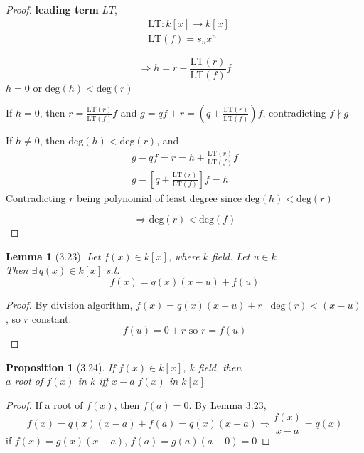 \documentclass[twoside,landscape]{amsart}
\theoremstyle{plain}
\newtheorem{lemma}{Lemma}
\newtheorem{proposition}{Proposition}
\theoremstyle{definition}
\theoremstyle{remark}
\begin{document}
\begin{multicols*}{2}
\begin{proof}
\textbf{leading term} $LT$, 
\[
\begin{aligned} 
  & \text{LT}:k[x] \to k[x] \\
  & \text{LT}(f) = s_n x^n \end{aligned}
\]

\[
\Longrightarrow h = r - \frac{\text{LT}(r) }{ \text{LT}(f) }f 
\]
$h=0$ or $\text{deg}(h) < \text{deg}(r)$

If $h=0$, then $r = \frac{\text{LT}(r)}{\text{LT}(f)}f$ and $g =qf + r = \left( q + \frac{\text{LT}(r)}{ \text{LT}(f)} \right)f$, contradicting $f \nmid g$

If $h\neq 0$, then $\text{deg}(h) < \text{deg}(r)$, and 
\[
\begin{gathered}
  g - qf = r = h + \frac{\text{LT}(r) }{ \text{LT}(f) } f \\ 
  g - \left[ q + \frac{\text{LT}(r)}{ \text{LT}(f)} \right]f = h 
\end{gathered}
\]
Contradicting $r$ being polynomial of least degree since $\text{deg}(h) < \text{deg}(r)$

\[
\Longrightarrow \text{deg}(r) < \text{deg}(f)
\]



\end{proof}


\begin{lemma}[3.23]
  Let $f(x) \in k[x]$, where $k$ field.  Let $u\in k$ \\
Then $\exists \, q(x) \in k[x]$ s.t. 
\[
f(x) = q(x)(x-u) + f(u)
\]

\end{lemma}

\begin{proof}
  By division algorithm, $f(x) = q(x)(x-u) + r$ \quad \, $\text{deg}(r) < (x-u)$, so $r$ constant. 
\[
f(u) = 0 + r \text{ so } r = f(u)
\]
\end{proof}

\begin{proposition}[3.24]\label{Prop:3.24} If $f(x) \in k[x]$, $k$ field, then \\
$a$ root of $f(x)$ in $k$ iff $x-a | f(x)$ in $k[x]$
\end{proposition}

\begin{proof}
  If a root of $f(x)$, then $f(a) =0$.  By Lemma 3.23, 
\[
f(x) = q(x) (x-a) + f(a) = q(x)(x-a) \Longrightarrow \frac{f(x)}{x-a} =q(x)
\]
if $f(x) = g(x)(x-a)$, $f(a) = g(a)(a-0)=0$
\end{proof}


\end{multicols*}
\end{document}

